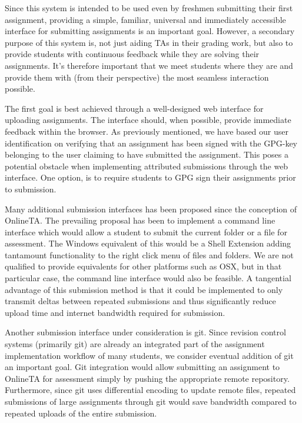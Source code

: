 Since this system is intended to be used even by freshmen submitting
their first assignment, providing a simple, familiar, universal and
immediately accessible interface for submitting assignments is an
important goal. However, a secondary purpose of this system is, not
just aiding TAs in their grading work, but also to provide students
with continuous feedback while they are solving their
assignments. It's therefore important that we meet students where they
are and provide them with (from their perspective) the most seamless
interaction possible.

The first goal is best achieved through a well-designed web interface
for uploading assignments. The interface should, when
possible,
provide immediate feedback within the browser. As previously
mentioned, we have based our user identification on verifying that an
assignment has been signed with the GPG-key belonging to the user
claiming to have submitted the assignment. This poses a potential
obstacle when implementing attributed submissions through the web
interface. One option, is to require students to GPG sign their
assignments prior to submission.


Many additional submission interfaces has been proposed since the
conception of OnlineTA. The prevailing proposal has been to implement
a command line interface which would allow a student to submit the
current folder or a file for assessment. The Windows equivalent of
this would be a Shell Extension adding tantamount functionality to the
right click menu of files and folders. We are not qualified to provide
equivalents for other platforms such as OSX, but in that particular
case, the command line interface would also be feasible. A tangential
advantage of this submission method is that it could be implemented to
only transmit deltas between repeated submissions and thus
significantly reduce upload time and internet bandwidth required for
submission.

Another submission interface under consideration is git. Since
revision control systems (primarily git) are already an integrated
part of the assignment implementation workflow of many students, we consider
eventual addition of git an important goal. Git integration would
allow submitting an assignment to OnlineTA for assessment simply by pushing the
appropriate remote repository. Furthermore, since git uses
differential encoding to update remote files, repeated submissions of
large assignments through git would save bandwidth compared to
repeated uploads of the entire submission.






